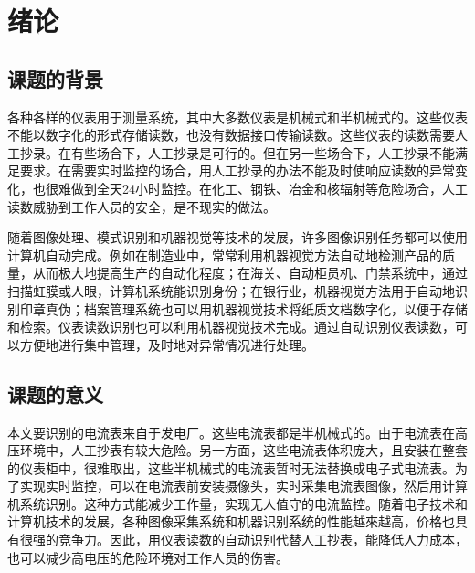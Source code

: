 
\chapter{绪论}

\section{课题的背景}

各种各样的仪表用于测量系统，其中大多数仪表是机械式和半机械式的。这些仪表不能以数字化的形式存储读数，也没有数据接口传输读数。这些仪表的读数需要人工抄录。在有些场合下，人工抄录是可行的。但在另一些场合下，人工抄录不能满足要求。在需要实时监控的场合，用人工抄录的办法不能及时使响应读数的异常变化，也很难做到全天24小时监控。在化工、钢铁、冶金和核辐射等危险场合，人工读数威胁到工作人员的安全，是不现实的做法。

随着图像处理、模式识别和机器视觉等技术的发展，许多图像识别任务都可以使用计算机自动完成。例如在制造业中，常常利用机器视觉方法自动地检测产品的质量，从而极大地提高生产的自动化程度；在海关、自动柜员机、门禁系统中，通过扫描虹膜或人眼，计算机系统能识别身份；在银行业，机器视觉方法用于自动地识别印章真伪；档案管理系统也可以用机器视觉技术将纸质文档数字化，以便于存储和检索。仪表读数识别也可以利用机器视觉技术完成。通过自动识别仪表读数，可以方便地进行集中管理，及时地对异常情况进行处理。



\section{课题的意义}

本文要识别的电流表来自于发电厂。这些电流表都是半机械式的。由于电流表在高压环境中，人工抄表有较大危险。另一方面，这些电流表体积庞大，且安装在整套的仪表柜中，很难取出，这些半机械式的电流表暂时无法替换成电子式电流表。为了实现实时监控，可以在电流表前安装摄像头，实时采集电流表图像，然后用计算机系统识别。这种方式能减少工作量，实现无人值守的电流监控。随着电子技术和计算机技术的发展，各种图像采集系统和机器识别系统的性能越來越高，价格也具有很强的竞争力。因此，用仪表读数的自动识别代替人工抄表，能降低人力成本，也可以减少高电压的危险环境对工作人员的伤害。


